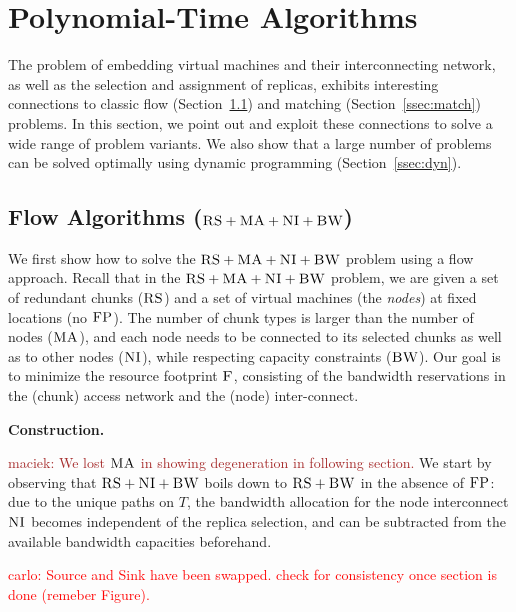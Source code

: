 \documentclass[9pt]{sigcomm-alternate}
\newcommand{\carlo}[1]{\textcolor{red}{carlo: #1}}
\newcommand{\maciek}[1]{\textcolor{brown}{maciek: #1}}
\newcommand{\CC}{\textsc{NI}}
\newcommand{\FP}{\textsc{FP}}
\newcommand{\RS}{\textsc{RS}}
\newcommand{\BW}{\textsc{BW}}
\newcommand{\MA}{\textsc{MA}}
\newcommand{\Cost}{\textsc{F}}
\newcommand{\Tree}{\ensuremath{T}}
\begin{document}
\section{Polynomial-Time Algorithms}\label{sec:poly}

The problem of embedding virtual machines and their interconnecting network,
as well as the selection and assignment of replicas,
exhibits interesting connections to classic flow (Section~\ref{ssec:flow}) and
matching (Section~\ref{ssec:match}) problems. In this section, we point out and exploit these connections 
to solve a wide range
of problem variants. We also show that a large number of problems
can be solved optimally using dynamic programming (Section~\ref{ssec:dyn}).

\subsection{Flow Algorithms ($\RS+\MA+\CC+\BW$)}\label{ssec:flow}

We first show how to solve
the $\RS+\MA+\CC+\BW$ problem using a flow approach.
Recall that in the $\RS+\MA+\CC+\BW$ problem,
we are given a set of redundant chunks ($\RS$) and a set of virtual machines
(the \emph{nodes})
at fixed locations (no $\FP$). The number of chunk types is larger than the number
of nodes ($\MA$), and each node needs to be connected
to its selected chunks as well as to other nodes ($\CC$), while respecting
capacity constraints ($\BW$).
Our goal is to minimize the resource footprint $\Cost$, consisting
of the bandwidth reservations in the (chunk) access network and the (node) inter-connect.


\textbf{Construction.}

\maciek{We lost $\MA$ in showing degeneration in following section.}
We start by observing that $\RS+\CC+\BW$ boils down to
$\RS+\BW$ in the absence of $\FP$: due to the unique paths
on $\Tree$, the bandwidth allocation for the node interconnect
$\CC$ becomes independent of the replica selection, and can be subtracted
from the available bandwidth capacities beforehand.

\carlo{Source and Sink have been swapped. check for consistency once section is
done (remeber Figure).}
\end{document}
